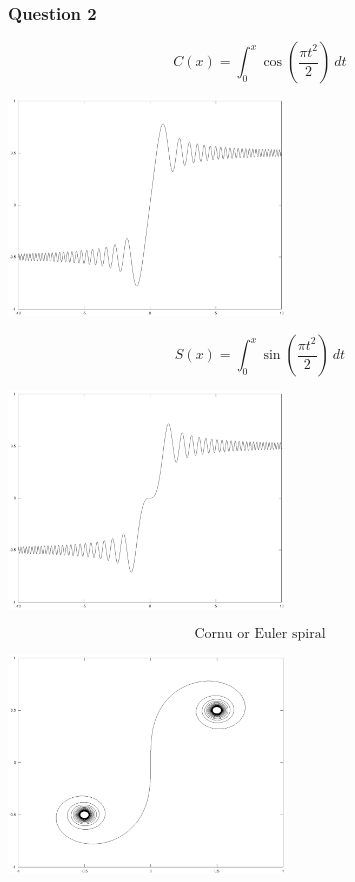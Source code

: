 \documentclass[11pt,a4paper]{article}
\begin{document}
\subsubsection*{Question 2}
$$C(x)=\int^x_0 \cos\left(\frac{\pi t^2}{2}\right) \ dt$$
\begin{center}
	\includegraphics[width=0.55\textwidth]{fresc.eps}
\end{center}
$$S(x)=\int^x_0 \sin\left(\frac{\pi t^2}{2}\right) \ dt$$
\begin{center}
	\includegraphics[width=0.55\textwidth]{fress.eps}
\end{center}
$$\text{Cornu or Euler spiral}$$
\begin{center}
	\includegraphics[width=0.55\textwidth]{cornu.eps}
\end{center}
\end{document}
